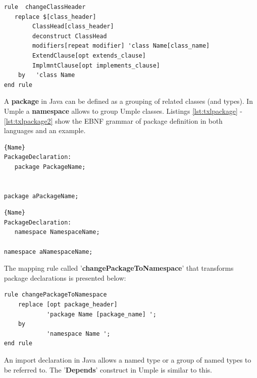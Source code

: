 \begin{lstlisting}[style=umplePlain, caption=TXL Mapping rule for transforming the class headers, label=lst:classHeader]
rule  changeClassHeader 	
   replace $[class_header] 		
    	ClassHead[class_header] 		
    	deconstruct ClassHead 					
    	modifiers[repeat modifier] 'class Name[class_name] 
        ExtendClause[opt extends_clause] 
        ImplmntClause[opt implements_clause]          
    by 	 'class Name 
end rule

\end{lstlisting}


A \textbf{package} in Java can be defined as a grouping of related classes (and types). In Umple a \textbf{namespace} allows to group Umple classes. Listings \ref{lst:txlpackage} - \ref{lst:txlpackage2} show the EBNF grammar of package definition in both languages and an example. 

\noindent\begin{minipage}{.45\textwidth}
\begin{lstlisting}[style=umplePlain,caption=Java Package,label=lst:txlpackage]{Name}
PackageDeclaration:
   package PackageName; 


package aPackageName;
\end{lstlisting}
\end{minipage}\hfill
\begin{minipage}{.45\textwidth}
\begin{lstlisting}[style=umplePlain,caption=Umple Namespace,label=lst:txlpackage2]{Name}
PackageDeclaration:
   namespace NamespaceName;
 
namespace aNamespaceName;
\end{lstlisting}
\end{minipage}


The mapping rule called '\textbf{changePackageToNamespace}' that transforms package declarations is presented below:

\begin{lstlisting}[style=umplePlain, label=lst:packageDeclRule, caption=TXL mapping rule for the transformation of the package declaration]
rule changePackageToNamespace 
    replace [opt package_header]      
            'package Name [package_name] '; 
    by       
            'namespace Name '; 
end rule	
\end{lstlisting}

An import declaration in Java allows a named type or a group of named types to be referred to. The '\textbf{Depends}' construct in Umple is similar to this. 

